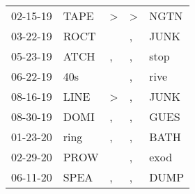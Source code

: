 \begin{supertabular}{p{0.07\textwidth}p{0.06\textwidth}p{0.02\textwidth}p{0.02\textwidth}p{0.06\textwidth}}
          02-15-19\textsuperscript{} &           TAPE\textsuperscript{} &     \textgreater &     \textgreater &           NGTN\textsuperscript{} \\
          03-22-19\textsuperscript{} &           ROCT\textsuperscript{} &                  &                , &           JUNK\textsuperscript{} \\
          05-23-19\textsuperscript{} &           ATCH\textsuperscript{} &                , &                , &           stop\textsuperscript{} \\
          06-22-19\textsuperscript{} &            40s\textsuperscript{} &                  &                , &           rive\textsuperscript{} \\
          08-16-19\textsuperscript{} &           LINE\textsuperscript{} &     \textgreater &                , &           JUNK\textsuperscript{} \\
          08-30-19\textsuperscript{} &           DOMI\textsuperscript{} &                , &                , &           GUES\textsuperscript{} \\
          01-23-20\textsuperscript{} &           ring\textsuperscript{} &                , &                , &           BATH\textsuperscript{} \\
          02-29-20\textsuperscript{} &           PROW\textsuperscript{} &                  &                , &           exod\textsuperscript{} \\
          06-11-20\textsuperscript{} &           SPEA\textsuperscript{} &                , &                , &           DUMP\textsuperscript{} \\
\end{supertabular}
